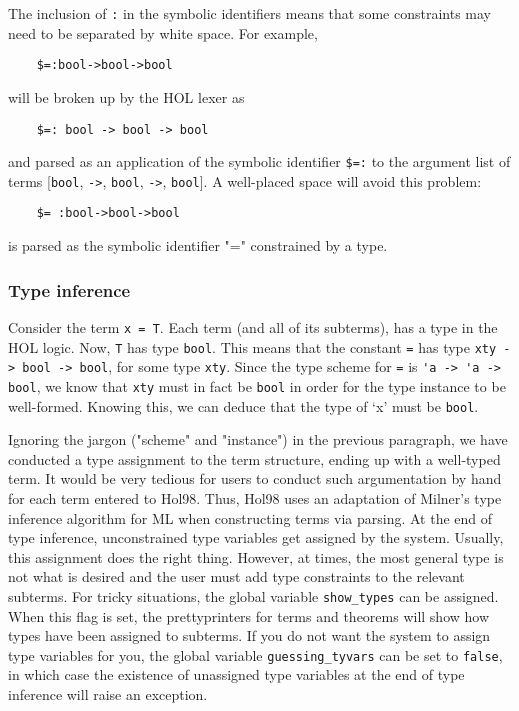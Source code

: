 The inclusion of \verb+:+ in the symbolic identifiers means that some
constraints may need to be separated by white space. For example,
\begin{verbatim}
    $=:bool->bool->bool
\end{verbatim}
will be broken up by the HOL lexer as
\begin{verbatim}
    $=: bool -> bool -> bool
\end{verbatim}
and parsed as an application of the symbolic identifier \verb+$=:+ to
the argument list of terms [\verb+bool+, \verb+->+, \verb+bool+,
\verb+->+, \verb+bool+]. A well-placed space will avoid this problem:
\begin{verbatim}
    $= :bool->bool->bool
\end{verbatim}
is parsed as the symbolic identifier "=" constrained by a type. 

 \subsubsection{Type inference}

Consider the term \verb+x = T+.
Each term (and all of its subterms), has a type in the HOL
logic. Now, \verb+T+ has type \verb+bool+. This means that the constant
\verb+=+ has type \verb+xty -> bool -> bool+, for some type
\verb+xty+. Since the type scheme for \verb+=+ is 
\verb+'a -> 'a -> bool+, we know that \verb+xty+ must in fact be
\verb+bool+ in order for the type instance to be well-formed. Knowing
this, we can deduce that the type of `x' must be \verb+bool+. 

   Ignoring the jargon ("scheme" and "instance") in the previous
paragraph, we have conducted a type assignment to the term structure,
ending up with a well-typed term. It would be very tedious for users to
conduct such argumentation by hand for each term entered to Hol98. Thus,
Hol98 uses an adaptation of Milner's type inference algorithm for ML
when constructing terms via parsing. At the end of type inference,
unconstrained type variables get assigned by the system. Usually, this
assignment does the right thing. However, at times, the most general
type is not what is desired and the user must add type constraints to
the relevant subterms. For tricky situations, the global variable
\verb+show_types+ can be assigned. When this flag is set, the prettyprinters
for terms and theorems will show how types have been assigned to
subterms. If you do not want the system to assign type variables for
you, the global variable \verb+guessing_tyvars+ can be set to
\verb+false+, in which case the existence of unassigned type variables
at the end of type inference will raise an exception.

